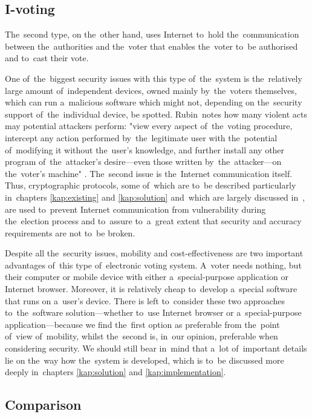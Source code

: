 \subsection{I-voting}
The~second type, on the~other hand, uses Internet to~hold the~communication between the~authorities and the~voter that enables the~voter to~be authorised and to~cast their vote. 

One of~the~biggest security issues with this type of~the~system is the~relatively large amount of~independent devices, owned mainly by~the~voters themselves, which can run a~malicious software which might not, depending on the~security support of~the~individual device, be spotted. 
Rubin~notes how many violent acts may potential attackers perform: "view every aspect of~the~voting procedure, intercept any action performed by~the~legitimate user with the~potential of~modifying it without the~user’s knowledge, and further install any other program of~the~attacker’s desire—even those written by~the~attacker—on the~voter’s machine" \cite{Rubin}.  The~second issue is the~Internet communication itself. Thus, cryptographic protocols, some of~which are to~be described particularly in~chapters \ref{kap:existing} and \ref{kap:solution} and~which are largely discussed in~\cite{Rjaskova}, are used to~prevent Internet communication from vulnerability during the~election process and to~assure to~a~great extent that security and accuracy requirements are not to~be broken.

Despite all the~security issues, mobility and cost-effectiveness are two important advantages of~this type of~electronic voting system. A~voter needs nothing, but their computer or mobile device with either a~special-purpose application or Internet browser. Moreover, it is relatively cheap to~develop a~special software that runs on a~user's device. There is left to~consider these two approaches to~the~software solution—whether to~use Internet browser or a~special-purpose application—because we find the~first option as preferable from the~point of~view of~mobility, whilst the~second is, in~our opinion, preferable when considering security. We should still bear in~mind that a~lot of~important details lie on the~way how the~system is developed, which is to~be discussed more deeply in~chapters \ref{kap:solution} and \ref{kap:implementation}.

\subsection{Comparison}

